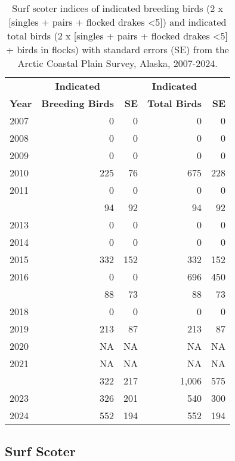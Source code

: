 \documentclass[
]{article}
\begin{document}
\begingroup\fontsize{10}{12}\selectfont

\begin{longtable}[t]{lrrrr}

\caption{\label{tbl-SUSC}Surf scoter indices of indicated breeding birds
(2 x {[}singles + pairs + flocked drakes \textless5{]}) and indicated
total birds (2 x {[}singles + pairs + flocked drakes \textless5{]} +
birds in flocks) with standard errors (SE) from the Arctic Coastal Plain
Survey, Alaska, 2007-2024.}

\tabularnewline

\\
\toprule
\multicolumn{1}{c}{\textbf{ }} & \multicolumn{1}{c}{\textbf{Indicated}} & \multicolumn{1}{c}{\textbf{ }} & \multicolumn{1}{c}{\textbf{Indicated}} & \multicolumn{1}{c}{\textbf{ }} \\
\cmidrule(l{3pt}r{3pt}){2-2} \cmidrule(l{3pt}r{3pt}){4-4}
\textbf{Year} & \textbf{Breeding Birds} & \textbf{SE} & \textbf{Total Birds} & \textbf{SE}\\
\midrule
2007 & 0 & 0 & 0 & 0\\
2008 & 0 & 0 & 0 & 0\\
2009 & 0 & 0 & 0 & 0\\
2010 & 225 & 76 & 675 & 228\\
2011 & 0 & 0 & 0 & 0\\
\addlinespace
2012 & 94 & 92 & 94 & 92\\
2013 & 0 & 0 & 0 & 0\\
2014 & 0 & 0 & 0 & 0\\
2015 & 332 & 152 & 332 & 152\\
2016 & 0 & 0 & 696 & 450\\
\addlinespace
2017 & 88 & 73 & 88 & 73\\
2018 & 0 & 0 & 0 & 0\\
2019 & 213 & 87 & 213 & 87\\
2020 & NA & NA & NA & NA\\
2021 & NA & NA & NA & NA\\
\addlinespace
2022 & 322 & 217 & 1,006 & 575\\
2023 & 326 & 201 & 540 & 300\\
2024 & 552 & 194 & 552 & 194\\
\bottomrule

\end{longtable}

\endgroup{}

\newpage{}

\subsection*{Surf Scoter}\label{surf-scoter-2}
\end{document}
